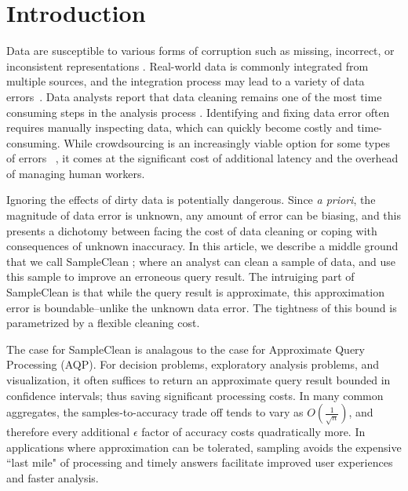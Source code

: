 \section{Introduction}
Data are susceptible to various forms of corruption such as missing,
incorrect, or inconsistent representations \cite{Gartner}.
Real-world data is commonly integrated from multiple sources, and the integration process may lead to a variety of data errors~\cite{DBLP:journals/pvldb/DongS13}. 
Data analysts report that data cleaning remains one of the most time
consuming steps in the analysis process \cite{nytimes}.
Identifying and fixing data error often requires manually inspecting data, which can quickly become costly and time-consuming. 
While crowdsourcing is an increasingly viable option for some types of errors ~\cite{DBLP:conf/sigmod/JefferyFH08,DBLP:journals/pvldb/FanLMTY10,DBLP:journals/pvldb/YakoutENOI11, gokhale2014corleone, park2014crowdfill, sampleclean,chu2015katara}, it comes at the significant cost of additional latency and the overhead of managing human workers. 

Ignoring the effects of dirty data is potentially dangerous.
Since \emph{a priori}, the magnitude of data error is unknown, any amount of error can be biasing, and this presents a dichotomy between facing the cost of data cleaning
or coping with consequences of unknown inaccuracy.
In this article, we describe a middle ground that we call SampleClean \cite{wang1999sample}; where an analyst can clean a sample of data, and use this sample to improve an erroneous query result.
The intruiging part of SampleClean is that while the query result is approximate, this approximation error is boundable--unlike the unknown data error.
The tightness of this bound is parametrized by a flexible cleaning cost.

The case for SampleClean is analagous to the case for Approximate Query Processing \cite{DBLP:conf/icde/OlkenR92, olken1993random, garofalakis2001approximate, AgarwalMPMMS13} (AQP).
For decision problems, exploratory analysis problems, and visualization, it often suffices to return an approximate query result bounded in confidence intervals; thus saving significant processing costs.
In many common aggregates, the samples-to-accuracy trade off tends to vary as $O(\frac{1}{\sqrt{n}})$, and therefore every additional $\epsilon$ factor of accuracy costs quadratically more. 
In applications where approximation can be tolerated, sampling avoids the expensive ``last mile" of processing and timely answers facilitate improved user experiences and faster analysis.

